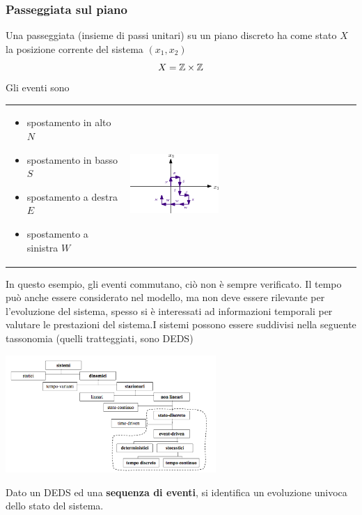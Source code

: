 \documentclass[10pt, letterpaper]{report}
\begin{document}
\subsubsection{Passeggiata sul piano}
Una passeggiata (insieme di passi unitari) su un piano discreto ha come stato $X$ la posizione corrente del sistema $(x_1,x_2)$ $$ X={\mathbb Z}\times {\mathbb Z}$$ 
Gli eventi sono
\begin{center}
	\begin{tabular}{>{\centering\arraybackslash}m{3in}>{\arraybackslash}m{3in}} 
\begin{itemize}
    \item spostamento in alto $N$
    \item spostamento in basso $S$ 
    \item spostamento a destra $E$
    \item spostamento a sinistra $W$
\end{itemize}  & \includegraphics[width=0.4\textwidth]{images/randomWalk.eps}
		\\
	\end{tabular}
\end{center}
In questo esempio, gli eventi commutano, ciò non è sempre verificato. Il tempo può anche essere considerato nel modello, ma non deve essere rilevante per l'evoluzione del sistema, spesso si è interessati ad informazioni temporali per valutare le prestazioni del sistema.\acc  I sistemi possono essere suddivisi nella seguente tassonomia (quelli tratteggiati, sono DEDS)\begin{center}
    \includegraphics[width=0.6\textwidth]{images/tassonomiaSistemi.png}
\end{center}
Dato un DEDS ed una \textbf{sequenza di eventi}, si identifica un evoluzione univoca dello stato del sistema.\acc 
\end{document}
